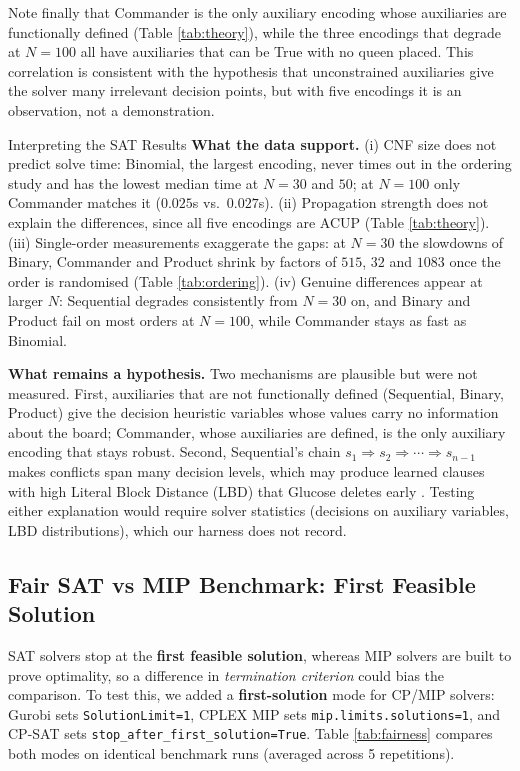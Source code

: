 \documentclass[a4paper,fleqn]{cas-sc}
\begin{document}
Note finally that Commander is the only auxiliary encoding whose auxiliaries are functionally defined (Table \ref{tab:theory}), while the three encodings that degrade at $N=100$ all have auxiliaries that can be True with no queen placed. This correlation is consistent with the hypothesis that unconstrained auxiliaries give the solver many irrelevant decision points, but with five encodings it is an observation, not a demonstration.

\begin{insightbox}{Interpreting the SAT Results}
\textbf{What the data support.} (i) CNF size does not predict solve time: Binomial, the largest encoding, never times out in the ordering study and has the lowest median time at $N=30$ and $50$; at $N=100$ only Commander matches it ($0.025$s vs.\ $0.027$s). (ii) Propagation strength does not explain the differences, since all five encodings are ACUP (Table \ref{tab:theory}). (iii) Single-order measurements exaggerate the gaps: at $N=30$ the slowdowns of Binary, Commander and Product shrink by factors of $515$, $32$ and $1083$ once the order is randomised (Table \ref{tab:ordering}). (iv) Genuine differences appear at larger $N$: Sequential degrades consistently from $N=30$ on, and Binary and Product fail on most orders at $N=100$, while Commander stays as fast as Binomial.

\smallskip
\textbf{What remains a hypothesis.} Two mechanisms are plausible but were not measured. First, auxiliaries that are not functionally defined (Sequential, Binary, Product) give the decision heuristic variables whose values carry no information about the board; Commander, whose auxiliaries are defined, is the only auxiliary encoding that stays robust. Second, Sequential's chain $s_1 \Rightarrow s_2 \Rightarrow \cdots \Rightarrow s_{n-1}$ makes conflicts span many decision levels, which may produce learned clauses with high Literal Block Distance (LBD) that Glucose deletes early \cite{audemard2009predicting}. Testing either explanation would require solver statistics (decisions on auxiliary variables, LBD distributions), which our harness does not record.
\end{insightbox}

\subsection{Fair SAT vs MIP Benchmark: First Feasible Solution}
\label{sec:fairness}
SAT solvers stop at the \textbf{first feasible solution}, whereas MIP solvers are built to prove optimality, so a difference in \emph{termination criterion} could bias the comparison. To test this, we added a \textbf{first-solution} mode for CP/MIP solvers: Gurobi sets \texttt{SolutionLimit=1}, CPLEX MIP sets \texttt{mip.limits.solutions=1}, and CP-SAT sets \texttt{stop\_after\_first\_solution=True}. Table \ref{tab:fairness} compares both modes on identical benchmark runs (averaged across 5 repetitions).
\end{document}
